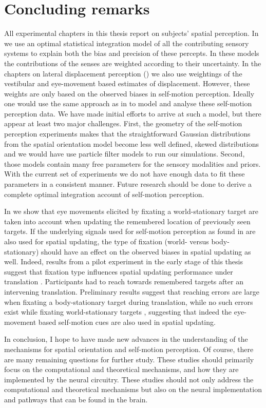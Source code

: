 \section{Concluding remarks}

All experimental chapters in this thesis report on subjects’ spatial perception. In  we use an optimal statistical integration model of all the contributing sensory systems to explain both the bias and precision of these percepts. In these models the contributions of the senses are weighted according to their uncertainty. In the chapters on lateral displacement perception () we also use weightings of the vestibular and eye-movement based estimates of displacement. However, these weights are only based on the observed biases in self-motion perception. Ideally one would use the same approach as in  to model and analyse these self-motion perception data. We have made initial efforts to arrive at such a model, but there appear at least two major challenges. First, the geometry of the self-motion perception experiments makes that the straightforward Gaussian distributions from the spatial orientation model become less well defined, skewed distributions and we would have use particle filter models to run our simulations. Second, those models contain many free parameters for the sensory modalities and priors. With the current set of experiments we do not have enough data to fit these parameters in a consistent manner. Future research should be done to derive a complete optimal integration account of self-motion perception.

In  we show that eye movements elicited by fixating a world-stationary target are taken into account when updating the remembered location of previously seen targets.  If the underlying signals used for self-motion perception as found in  are also used for spatial updating, the type of fixation (world- versus body-stationary) should have an effect on the observed biases in spatial updating as well. Indeed, results from a pilot experiment in the early stage of this thesis suggest that fixation type influences spatial updating performance under translation \cite{clemens2010}. Participants had to reach towards remembered targets after an intervening translation. Preliminary results suggest that reaching errors are large when fixating a body-stationary target during translation, while no such errors exist while fixating world-stationary targets \cite{clemens2010}, suggesting that indeed the eye-movement based self-motion cues are also used in spatial updating.

In conclusion, I hope to have made new advances in the understanding of the mechanisms for spatial orientation and self-motion perception. Of course, there are many remaining questions for further study. These studies should primarily focus on the computational and theoretical mechanisms, and how they are implemented by the neural circuitry. These studies should not only address the computational and theoretical mechanisms but also on the neural implementation and pathways that can be found in the brain.

 